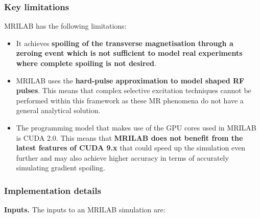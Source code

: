 \subsubsection{Key limitations}
MRILAB has the following limitations:
\begin{itemize}
    
    \item It achieves \textbf{spoiling of the transverse magnetisation through a zeroing event which is not sufficient to model real experiments where complete spoiling is not desired}.
    
    \item MRILAB uses the \textbf{hard-pulse approximation to model shaped RF pulses}.
    This means that complex selective excitation techniques cannot be performed within this framework as these MR phenomena do not have a general analytical solution.
    
    \item The programming model that makes use of the GPU cores used in MRILAB is CUDA 2.0. 
    This means that \textbf{MRILAB does not benefit from the latest features of CUDA 9.x} that could speed up the simulation even further and may also achieve higher accuracy in terms of accurately simulating gradient spoiling.
    
\end{itemize}

\hfill

\subsubsection{Implementation details}

\textbf{Inputs.} The inputs to an MRILAB simulation are:

